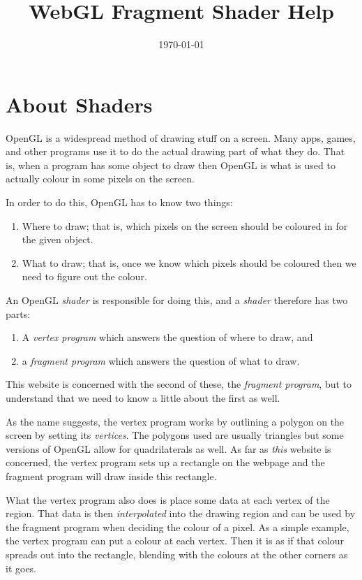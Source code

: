 \documentclass[
  html5,%
  mathml,%
  use filename%
]{internet}
\title{WebGL Fragment Shader Help}
\date{\today}
\makeatletter
\let\prev@sec=\section
\renewcommand\section{\clearpage\prev@sec}
\makeatother
\begin{document}
\maketitle

\tableofcontents

\section{About Shaders}

OpenGL is a widespread method of drawing stuff on a screen.
Many apps, games, and other programs use it to do the actual drawing part of what they do.
That is, when a program has some object to draw then OpenGL is what is used to actually colour in some pixels on the screen.

In order to do this, OpenGL has to know two things:
%
\begin{enumerate}
\item Where to draw; that is, which pixels on the screen should be coloured in for the given object.
\item What to draw; that is, once we know which pixels should be coloured then we need to figure out the colour.
\end{enumerate}

An OpenGL \emph{shader} is responsible for doing this, and a \emph{shader} therefore has two parts:
%
\begin{enumerate}
\item A \emph{vertex program} which answers the question of where to draw, and
\item a \emph{fragment program} which answers the question of what to draw.
\end{enumerate}

This website is concerned with the second of these, the \emph{fragment program}, but to understand that we need to know a little about the first as well.

As the name suggests, the vertex program works by outlining a polygon on the screen by setting its \emph{vertices}.
The polygons used are usually triangles but some versions of OpenGL allow for quadrilaterals as well.
As far as \emph{this} website is concerned, the vertex program sets up a rectangle on the webpage and the fragment program will draw inside this rectangle.

What the vertex program also does is place some data at each vertex of the region.
That data is then \emph{interpolated} into the drawing region and can be used by the fragment program when deciding the colour of a pixel.
As a simple example, the vertex program can put a colour at each vertex.
Then it is as if that colour spreads out into the rectangle, blending with the colours at the other corners as it goes.
\end{document}
